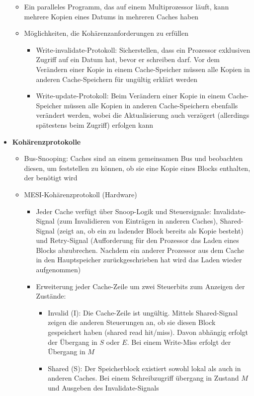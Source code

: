 \begin{itemize}
\begin{itemize}
		\item Ein paralleles Programm, das auf einem Multiprozessor läuft, kann mehrere Kopien eines Datums in mehreren Caches haben
		\item Möglichkeiten, die Kohärenzanforderungen zu erfüllen
		\begin{itemize}
			\item Write-invalidate-Protokoll: Sicherstellen, dass ein Prozessor exklusiven Zugriff auf ein Datum hat, bevor er schreiben darf. Vor dem Verändern einer Kopie in einem Cache-Speicher müssen alle Kopien in anderen Cache-Speichern für ungültig erklärt werden
			\item Write-update-Protokoll: Beim Verändern einer Kopie in einem Cache-Speicher müssen alle Kopien in anderen Cache-Speichern ebenfalls verändert werden, wobei die Aktualisierung auch verzögert (allerdings spätestens beim Zugriff) erfolgen kann
		\end{itemize}
	\end{itemize}
	\item \textbf{Kohärenzprotokolle}
	\begin{itemize}
		\item Bus-Snooping: Caches sind an einem gemeinsamen Bus und beobachten diesen, um feststellen zu können, ob sie eine Kopie eines Blocks enthalten, der benötigt wird
		\item MESI-Kohärenzprotokoll (Hardware)
		\begin{itemize}
			\item Jeder Cache verfügt über Snoop-Logik und Steuersignale: Invalidate-Signal (zum Invalidieren von Einträgen in anderen Caches), Shared-Signal (zeigt an, ob ein zu ladender Block bereits als Kopie besteht) und Retry-Signal (Aufforderung für den Prozessor das Laden eines Blocks abzubrechen. Nachdem ein anderer Prozessor aus dem Cache in den Hauptspeicher zurückgeschrieben hat wird das Laden wieder aufgenommen)
			\item Erweiterung jeder Cache-Zeile um zwei Steuerbits zum Anzeigen der Zustände:
			\begin{itemize}
				\item Invalid (I): Die Cache-Zeile ist ungültig. Mittels Shared-Signal zeigen die anderen Steuerungen an, ob sie diesen Block gespeichert haben (shared read hit/miss). Davon abhängig erfolgt der Übergang in \(S\) oder \(E\). Bei einem Write-Miss erfolgt der Übergang in \(M\)
				\item Shared (S): Der Speicherblock existiert sowohl lokal als auch in anderen Caches. Bei einem Schreibzugriff übergang in Zustand \(M\) und Ausgeben des Invalidate-Signals

\end{itemize}
\end{itemize}
\end{itemize}
\end{itemize}
